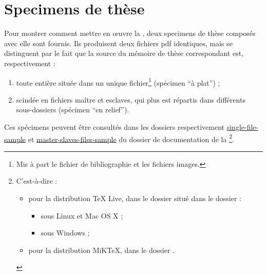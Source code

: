 \chapter{Specimens de thèse}\label{cha:specimen}

Pour montrer comment mettre en œuvre la \yatcl, deux specimens de thèse
composés avec elle sont fournis.  Ils produisent deux fichiers \gls{pdf}
identiques, mais se distinguent par le fait que la source  du
mémoire de thèse correspondant est, respectivement :
\begin{enumerate}
\item toute entière située dans un unique fichier\footnote{Mis à part le
    fichier de bibliographie et les fichiers images.} (spécimen \enquote{à
    plat}) ;
\item scindée en fichiers maître et esclaves, qui plus est répartis dans
  différents sous-dossiers (spécimen \enquote{en relief}).
\end{enumerate}

Ces spécimens peuvent être consultés dans les dossiers respectivement
\href{single-file-sample/.}{single-file-sample} et
\href{master-slaves-files-sample/.}{master-slaves-files-sample} du dossier
de documentation de la \yatcl{}\footnote{C'est-à-dire :
  \begin{itemize}
  \item pour la distribution \TeX{} Live, dans le dossier
    \tldistdirectory\jobdocdirectory{} situé dans le dossier :
    \begin{itemize}
    \item \unixtldirectory{} sous Linux et Mac OS X ;
    \item \wintldirectory{} sous Windows ;
    \end{itemize}
  \item pour la distribution MiK\TeX, dans le dossier \miktexdistdirectory.
  \end{itemize}
}.


